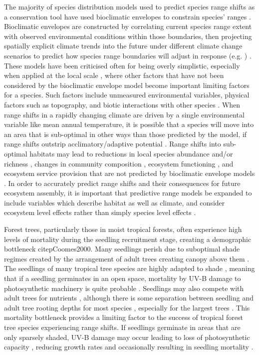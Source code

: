 \documentclass[a4paper,11pt]{article}
\begin{document}
The majority of species distribution models used to predict species range shifts as a conservation tool have used bioclimatic envelopes to constrain species' ranges \citep{Pearson2003}. Bioclimatic envelopes are constructed by correlating current species range extent with observed environmental conditions within those boundaries, then projecting spatially explicit climate trends into the future under different climate change scenarios to predict how species range boundaries will adjust in response (e.g. \citealt{Berry2002, Peterson2002, Thuiller2005, Araujo2006}) \citep{Sinclair2010}. These models have been criticised often for being overly simplistic, especially when applied at the local scale \citep{}, where other factors that have not been considered by the bioclimatic envelope model become important limiting factors for a species. Such factors include unmeasured environmental variables, physical factors such as topography, and biotic interactions with other species \citep{Davis1998, Putten2010, Ettinger2011}. When range shifts in a rapidly changing climate are driven by a single environmental variable like mean annual temperature, it is possible that a species will move into an area that is sub-optimal in other ways than those predicted by the model, if range shifts outstrip acclimatory/adaptive potential \citep{}. Range shifts into sub-optimal habitats may lead to reductions in local species abundance and/or richness \citep{Colwell2008}, changes in community composition \citep{}, ecosystem functioning \citep{Bellard2012}, and ecosystem service provision that are not predicted by bioclimatic envelope models \citep{Dobson2011, Isbell2011}. In order to accurately predict range shifts and their consequences for future ecosystem assembly, it is important that predictive range models be expanded to include variables which describe habitat as well as climate, and consider ecosystem level effects rather than simply species level effects \citep{}.

Forest trees, particularly those in moist tropical forests, often experience high levels of mortality during the seedling recruitment stage, creating a demographic bottleneck citep{Coomes2000}. Many seedlings perish due to suboptimal shade regimes created by the arrangement of adult trees creating canopy above them \citep{}. The seedlings of many tropical tree species are highly adapted to shade \citep{}, meaning that if a seedling germinates in an open space, mortality by UV-B damage to photosynthetic machinery is quite probable \citep{}. Seedlings may also compete with adult trees for nutrients \citep{}, although there is some separation between seedling and adult tree rooting depths for most species \citep{}, especially for the largest trees \citep{}. This mortality bottleneck provides a limiting factor to the success of tropical forest tree species experiencing range shifts. If seedlings germinate in areas that are only sparsely shaded, UV-B damage may occur leading to loss of photosynthetic capacity \citep{}, reducing growth rates and occasionally resulting in seedling mortality \citep{}.  
\end{document}
